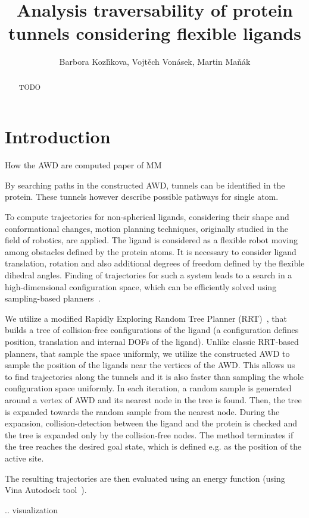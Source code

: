 \documentclass[conference]{IEEEtran}
\title{Analysis traversability of  protein tunnels considering flexible ligands}
\author{
Barbora Kozl\'\i kova, Vojt\v{e}ch Von\'{a}sek, Martin Ma\v{n}\'{a}k
}
\begin{document}
\maketitle

\begin{abstract}
TODO
\end{abstract}

\section{Introduction}



How the AWD are computed
paper of MM \cite{manak2017hybrid}

By searching paths in the constructed AWD, tunnels can be identified in the protein.
These tunnels however describe possible pathways for single atom.

To compute trajectories for non-spherical ligands, considering their shape and conformational changes, 
motion planning techniques, originally studied in the field of robotics, are applied.
The ligand is considered as a flexible robot moving among obstacles defined by the protein atoms.
It is necessary to consider ligand translation, rotation and also additional degrees of freedom defined by the flexible dihedral angles.
Finding of trajectories for such a system leads to a search in a high-dimensional configuration space, which can be efficiently
solved using sampling-based planners~\cite{Lav06}.

We utilize a modified Rapidly Exploring Random Tree Planner (RRT)~\cite{vonasek2017tunnel}, that builds
a tree of collision-free configurations of the ligand (a configuration defines position, translation and internal DOFs of the ligand).
Unlike classic RRT-based planners, that sample the space uniformly, we utilize the constructed AWD to sample the position
of the ligands near the vertices of the AWD.
This allows us to find trajectories along the tunnels and it is also faster than sampling the whole configuration space uniformly.
In each iteration, a random sample is generated around a vertex of AWD and its nearest node in the tree is found.
Then, the tree is expanded towards the random sample from the nearest node. 
During the expansion, collision-detection between the ligand and the protein is checked and the tree is expanded only by the 
collision-free nodes.
The method terminates if the tree reaches the desired goal state, which is  defined e.g. as the position of the active site.

The resulting trajectories are then evaluated using an energy function (using Vina Autodock tool~\cite{trott2009autodock}).


..
visualization




\end{document}
